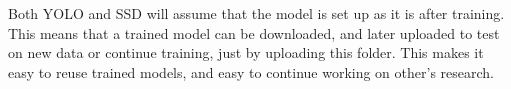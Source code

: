 \vspace{3mm}

Both YOLO and SSD will assume that the model is set up as it is after training. This means that a trained model can be downloaded, and later uploaded to test on new data or continue training, just by uploading this folder. This makes it easy to reuse trained models, and easy to continue working on other's research.









\cleardoublepage